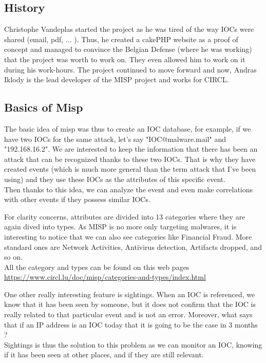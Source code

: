 \documentclass{eplmastersthesis}
\begin{document}
\subsection{History}
Christophe Vandeplas started the project as he was tired of the way IOCs were shared (email, pdf, ... ). Thus, he created a cakePHP website as a proof of concept and managed to convince the Belgian Defense (where he was working) that the project was worth to work on. They even allowed him to work on it during his work-hours. The project continued to move forward and now, Andras Iklody is the lead developer of the MISP project and works for CIRCL.\\

\subsection{Basics of Misp}
The basic idea of misp was thus to create an IOC database, for example, if we have two IOCs for the same attack, let's say "IOC@malware.mail" and "192.168.16.2". We are interested to  keep the information that there has been an attack that can be recognized thanks to these two IOCs. That is why they have created events (which is much more general than the term attack that I've been using) and they use these IOCs as the attributes of this specific event. \\
Then thanks to this idea, we can analyze the event and even make correlations with other events if they possess similar IOCs.

For clarity concerns, attributes are divided into 13 categories where they are again dived into types. As MISP is no more only targeting malwares, it is interesting to notice that we can also see categories like Financial Fraud. More standard ones are Network Activities, Antivirus detection, Artifacts dropped, and so on.\\
All the category and types can be found on this web pages \url{https://www.circl.lu/doc/misp/categories-and-types/index.html}

One other really interesting feature is sightings. When an IOC is referenced, we know that it has been seen by someone, but it does not confirm that the IOC is really related to that particular event and is not an error. Moreover, what says that if an IP address is an IOC today that it is going to be the case in 3 months ? \\
Sightings is thus the solution to this problem as we can monitor an IOC, knowing if it has been seen at other places, and if they are still relevant.
\end{document}
